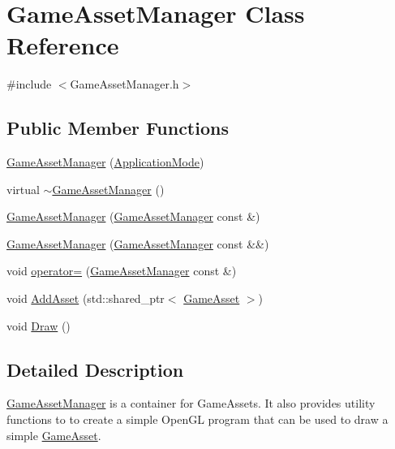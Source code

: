 \hypertarget{class_game_asset_manager}{}\section{Game\+Asset\+Manager Class Reference}
\label{class_game_asset_manager}


{\ttfamily \#include $<$Game\+Asset\+Manager.\+h$>$}

\subsection*{Public Member Functions}
\begin{DoxyCompactItemize}
\item 
\hyperlink{class_game_asset_manager_aaa0d58e276cc10ad91a7457085598a71}{Game\+Asset\+Manager} (\hyperlink{common_8h_add86e7c88dd109abea3f708b422f31f0}{Application\+Mode})
\item 
virtual \hyperlink{class_game_asset_manager_a1270bd61ecbcca563f079803e40c9b77}{$\sim$\+Game\+Asset\+Manager} ()
\item 
\hyperlink{class_game_asset_manager_a2c9adcb72faa154c87eadc9bafe5269d}{Game\+Asset\+Manager} (\hyperlink{class_game_asset_manager}{Game\+Asset\+Manager} const \&)
\item 
\hyperlink{class_game_asset_manager_a44f6e2fd6b8ff1dd64e5697f1be7386d}{Game\+Asset\+Manager} (\hyperlink{class_game_asset_manager}{Game\+Asset\+Manager} const \&\&)
\item 
void \hyperlink{class_game_asset_manager_ac72678a4ad5378c685aa6bae84a4e712}{operator=} (\hyperlink{class_game_asset_manager}{Game\+Asset\+Manager} const \&)
\item 
void \hyperlink{class_game_asset_manager_ad3de8ff00d55ba04728b1de8213b2349}{Add\+Asset} (std\+::shared\+\_\+ptr$<$ \hyperlink{class_game_asset}{Game\+Asset} $>$)
\item 
void \hyperlink{class_game_asset_manager_a32837132bd70a9a9ed537323c2d3d886}{Draw} ()
\end{DoxyCompactItemize}


\subsection{Detailed Description}
\hyperlink{class_game_asset_manager}{Game\+Asset\+Manager} is a container for Game\+Assets. It also provides utility functions to to create a simple Open\+G\+L program that can be used to draw a simple \hyperlink{class_game_asset}{Game\+Asset}. 

